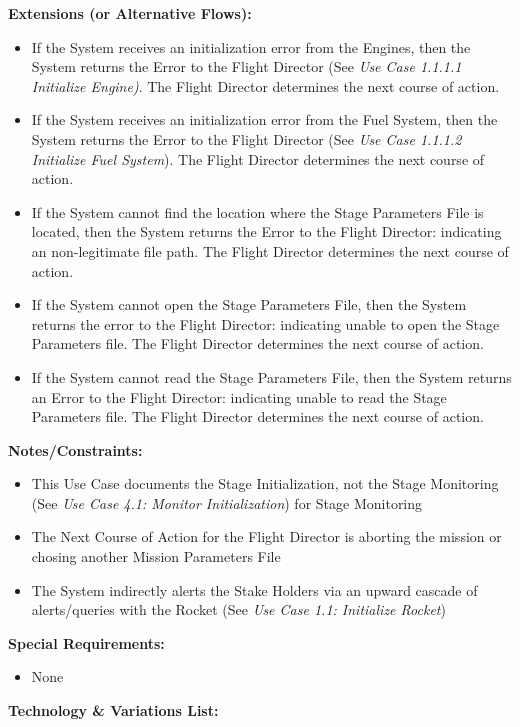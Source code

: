 \documentclass[letterpaper]{article}
\begin{document}
\textbf{Extensions (or Alternative Flows):}
\begin{itemize}
\item[2a]If the System receives an initialization error from the 
   Engines, then the System returns the Error to the Flight Director 
   (See \textit{Use Case 1.1.1.1 Initialize Engine)}.  The Flight 
   Director determines the next course of action.
\item[3a]If the System receives an initialization error from the Fuel
   System, then the System returns the Error to the Flight Director
   (See \textit{Use Case 1.1.1.2 Initialize Fuel System}).  The Flight
   Director determines the next course of action.
\item[4a,5a]If the System cannot find the location where the Stage 
   Parameters File is located, then the System returns the Error to 
   the Flight Director:  indicating an non-legitimate file path. The 
   Flight Director determines the next course of action.
\item[6a]If the System cannot open the Stage Parameters File, then
   the System returns the error to the Flight Director:  indicating
   unable to open the Stage Parameters file.  The Flight Director 
   determines the next course of action.
\item[7a]If the System cannot read the Stage Parameters File, then the
   System returns an Error to the Flight Director:  indicating unable
   to read the Stage Parameters file.  The Flight Director determines
   the next course of action.
\end{itemize}
\textbf{Notes/Constraints:}
\begin{itemize}
   \item[*a]This Use Case documents the Stage Initialization, not the 
      Stage Monitoring (See 
      \textit{Use Case 4.1: Monitor Initialization}) for Stage 
      Monitoring
   \item[*b]The Next Course of Action for the Flight Director is 
      aborting the mission or chosing another Mission Parameters File
   \item[9a]The System indirectly alerts the Stake Holders via an 
      upward cascade of alerts/queries with the Rocket (See 
      \textit{Use Case 1.1:  Initialize Rocket})
\end{itemize}
\textbf{Special Requirements:}
\begin{itemize}
   \item None
\end{itemize}
\textbf{Technology \& Variations List:}
\end{document}
